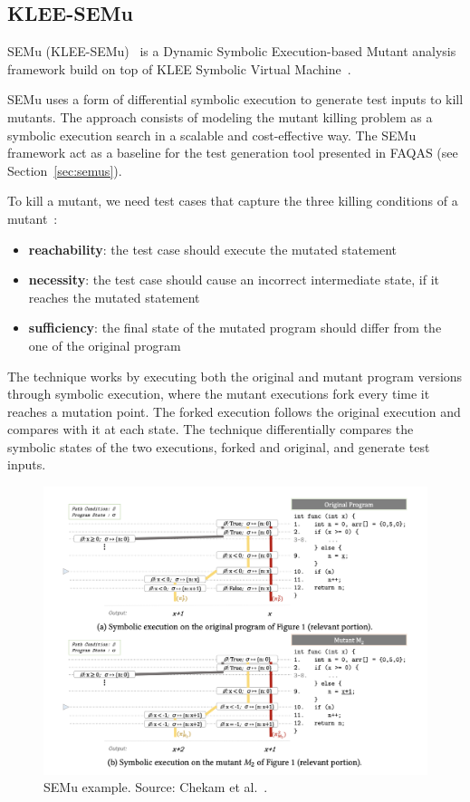 
\subsection{KLEE-SEMu}

SEMu (KLEE-SEMu)~\cite{chekam2021killing} is a Dynamic Symbolic Execution-based Mutant analysis framework build on top of KLEE Symbolic Virtual Machine~\cite{cadar2008klee}.

SEMu uses a form of differential symbolic execution to generate test inputs to kill mutants. The approach consists of modeling the mutant killing problem as a symbolic execution search in a scalable and cost-effective way. 
The SEMu framework act as a baseline for the test generation tool presented in FAQAS (see Section~\ref{sec:semus}).

To kill a mutant, we need test cases that capture the three killing conditions of a mutant~\cite{offutt1997automatically}: 
\begin{itemize}
	\item \textbf{reachability}: the test case should execute the mutated statement
	\item \textbf{necessity}: the test case should cause an incorrect intermediate state, if it reaches the mutated statement
	\item \textbf{sufficiency}: the final state of the mutated program should differ from the one of the original program
\end{itemize}

The technique works by executing both the original and mutant program versions through symbolic execution, where the mutant executions fork every time it reaches a mutation point. The forked execution follows the original execution and compares with it at each state. 
The technique differentially compares the symbolic states of the two executions, forked and original, and generate test inputs. 

\begin{figure}[tb]
\begin{center}
\includegraphics[width=\textwidth]{images/semu-example}
\caption{SEMu example. Source: Chekam et al.~\cite{chekam2021killing}.}
\label{fig:semu-example}
\end{center}
\end{figure}

